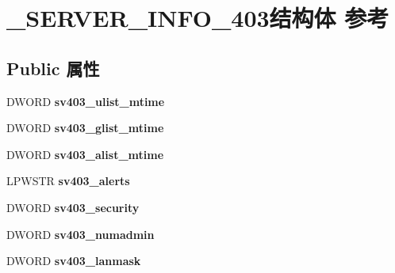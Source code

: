 \hypertarget{struct___s_e_r_v_e_r___i_n_f_o__403}{}\section{\+\_\+\+S\+E\+R\+V\+E\+R\+\_\+\+I\+N\+F\+O\+\_\+403结构体 参考}
\label{struct___s_e_r_v_e_r___i_n_f_o__403}
\subsection*{Public 属性}
\begin{DoxyCompactItemize}
\item 
\mbox{\label{struct___s_e_r_v_e_r___i_n_f_o__403_a16598b53780e871ff7a8d034645f0cd3}} 
D\+W\+O\+RD {\bfseries sv403\+\_\+ulist\+\_\+mtime}
\item 
\mbox{\label{struct___s_e_r_v_e_r___i_n_f_o__403_a87bc59014c5a3696a5e4b0adef045e6f}} 
D\+W\+O\+RD {\bfseries sv403\+\_\+glist\+\_\+mtime}
\item 
\mbox{\label{struct___s_e_r_v_e_r___i_n_f_o__403_a5ca786f00a5646999b14bb18a58a9685}} 
D\+W\+O\+RD {\bfseries sv403\+\_\+alist\+\_\+mtime}
\item 
\mbox{\label{struct___s_e_r_v_e_r___i_n_f_o__403_a580ac649c27f57c3d09017b48f837e91}} 
L\+P\+W\+S\+TR {\bfseries sv403\+\_\+alerts}
\item 
\mbox{\label{struct___s_e_r_v_e_r___i_n_f_o__403_a2c34878ba8afb86b79e9b623e895889d}} 
D\+W\+O\+RD {\bfseries sv403\+\_\+security}
\item 
\mbox{\label{struct___s_e_r_v_e_r___i_n_f_o__403_a8a1b15b7e194e253f8243c8ca6d7cc9f}} 
D\+W\+O\+RD {\bfseries sv403\+\_\+numadmin}
\item 
\mbox{\label{struct___s_e_r_v_e_r___i_n_f_o__403_ab9bfdfc30af49db1be462952230e911b}} 
D\+W\+O\+RD {\bfseries sv403\+\_\+lanmask}
\item 
\mbox{\label{struct___s_e_r_v_e_r___i_n_f_o__403_af015f7f2e60c9c3c8766d97bc6a25bed}} 

\end{DoxyCompactItemize}
